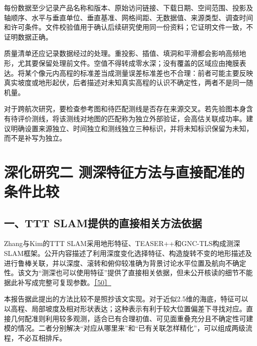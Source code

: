 每份数据至少记录产品名称和版本、原始访问链接、下载日期、空间范围、投影及轴顺序、水平与垂直单位、垂直基准、网格间距、无数据值、来源类型、调查时间和许可条件。文件校验值用于确认后续研究使用同一份资料；它证明文件一致，不证明数据正确。

质量清单还应记录数据经过的处理。重投影、插值、填洞和平滑都会影响高频地形，尤其要保留处理前文件。空值不得转成零水深；没有覆盖的区域应由掩膜表达。将某个像元内高程的标准差当成测量误差标准差也不合理：前者可能主要反映真实坡度或地形起伏，后者描述对未知真实高程的认识不确定性，两者不是同一随机量。

对于跨航次研究，要检查参考图和待匹配测线是否存在来源交叉。若先验图本身含有待评价测线，将该测线对地图的匹配称为独立外部验证，会高估关联成功率。建议明确设置来源独立、时间独立和测线独立三种标识，并将未知标识保留为未知，而不是补写为独立。

\hypertarget{ux6df1ux5316ux7814ux7a76ux4e8c-ux6d4bux6df1ux7279ux5f81ux65b9ux6cd5ux4e0eux76f4ux63a5ux914dux51c6ux7684ux6761ux4ef6ux6bd4ux8f83}{%
\section{深化研究二 测深特征方法与直接配准的条件比较}\label{ux6df1ux5316ux7814ux7a76ux4e8c-ux6d4bux6df1ux7279ux5f81ux65b9ux6cd5ux4e0eux76f4ux63a5ux914dux51c6ux7684ux6761ux4ef6ux6bd4ux8f83}}

\hypertarget{ux4e00ttt-slamux63d0ux4f9bux7684ux76f4ux63a5ux76f8ux5173ux65b9ux6cd5ux4f9dux636e}{%
\subsection{一、TTT SLAM提供的直接相关方法依据}\label{ux4e00ttt-slamux63d0ux4f9bux7684ux76f4ux63a5ux76f8ux5173ux65b9ux6cd5ux4f9dux636e}}

Zhang与Kim的TTT SLAM采用地形特征、TEASER++和GNC-TLS构成测深SLAM框架。公开内容描述了利用深度变化选择特征、构造旋转不变的地形描述及进行鲁棒关联，并以深度、滚转和俯仰较准确为背景讨论水平位置及航向不确定性。该文为``测深也可以使用特征''提供了直接相关依据，但未公开核读的细节不能据此补写成完整可复现参数。\href{https://www.sciencedirect.com/science/article/pii/S0029801824001148}{［50］}

本报告据此提出的方法比较不是照抄该文实现。对于近似2.5维的海底，特征可以以高程、局部坡度及相对形状表达；这种表示有利于较大位置偏差下寻找对应。直接几何配准则利用较多观测，适合已有合理初值、可见面重叠充分且不确定性可建模的情况。二者分别解决``对应从哪里来''和``已有关联怎样精化''，可以组成两级流程，不必互相排斥。

